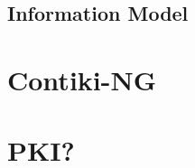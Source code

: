 \documentclass[0-thesis.tex]{subfiles}
\begin{document}

\subsection{Information Model}

\section{Contiki-NG}

\section{PKI?}
\end{document}
